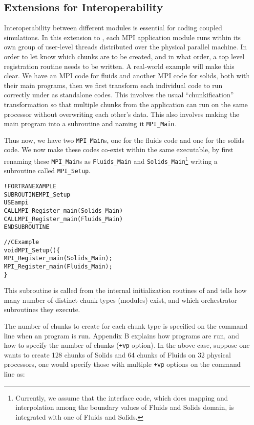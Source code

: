 \documentclass[10pt]{article}
\begin{document}
\subsection{Extensions for Interoperability}

Interoperability between different modules is essential for coding coupled
simulations.  In this extension to \ampi{}, each MPI application module runs
within its own group of user-level threads distributed over the physical
parallel machine.  In order to let \ampi{} know which chunks are to be created,
and in what order, a top level registration routine needs to be written. A
real-world example will make this clear. We have an MPI code for fluids and
another MPI code for solids, both with their main programs, then we first
transform each individual code to run correctly under \ampi{} as standalone
codes. This involves the usual ``chunkification'' transformation so that
multiple chunks from the application can run on the same processor without
overwriting each other's data. This also involves making the main program into
a subroutine and naming it \texttt{MPI\_Main}.

Thus now, we have two \texttt{MPI\_Main}s, one for the fluids code and one for
the solids code. We now make these codes co-exist within the same executable,
by first renaming these \texttt{MPI\_Main}s as \texttt{Fluids\_Main} and
\texttt{Solids\_Main}\footnote{Currently, we assume that the interface code,
which does mapping and interpolation among the boundary values of Fluids and
Solids domain, is integrated with one of Fluids and Solids.} writing a
subroutine called \texttt{MPI\_Setup}.

\begin{alltt}
!FORTRAN EXAMPLE
SUBROUTINE MPI_Setup
  USE ampi
  CALL MPI_Register_main(Solids_Main)
  CALL MPI_Register_main(Fluids_Main)
END SUBROUTINE

//C Example
void MPI_Setup()\{
  MPI_Register_main(Solids_Main);
  MPI_Register_main(Fluids_Main);
\}
\end{alltt}

This subroutine is called from the internal initialization routines of \ampi{}
and tells \ampi{} how many number of distinct chunk types (modules) exist, and
which orchestrator subroutines they execute.

The number of chunks to create for each chunk type is specified on the command
line when an \ampi{} program is run. Appendix B explains how \ampi{} programs
are run, and how to specify the number of chunks (\verb|+vp| option). In the
above case, suppose one wants to create 128 chunks of Solids and 64 chunks of
Fluids on 32 physical processors, one would specify those with multiple
\verb|+vp| options on the command line as:
\end{document}
